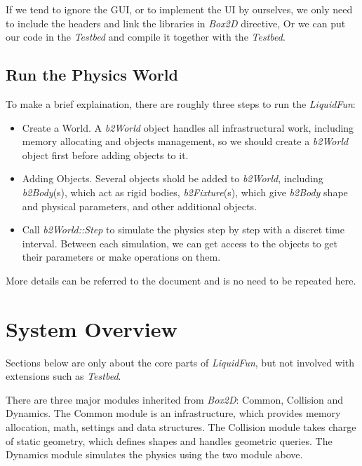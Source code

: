 \documentclass[UTF8]{ctexart}
\begin{document}
            If we tend to ignore the GUI, or to implement the UI by ourselves, we only need to include the headers and link the libraries in \textit{Box2D} directive, Or we can put our code in the \textit{Testbed} and compile it together with the \textit{Testbed}.

        \subsection{Run the Physics World}

            To make a brief explaination, there are roughly three steps to run the \textit{LiquidFun}:

            \begin{itemize}
                \item Create a World. A \textit{b2World} object handles all infrastructural work, including memory allocating and objects management, so we should create a \textit{b2World} object first before adding objects to it.
                \item Adding Objects. Several objects shold be added to \textit{b2World}, including \textit{b2Body}(s), which act as rigid bodies, \textit{b2Fixture}(s), which give \textit{b2Body} shape and physical parameters, and other additional objects.
                \item Call \textit{b2World::Step} to simulate the physics step by step with a discret time interval. Between each simulation, we can get access to the objects to get their parameters or make operations on them.
            \end{itemize}

            More details can be referred to the document and is no need to be repeated here.

    \section{System Overview}

        Sections below are only about the core parts of \textit{LiquidFun}, but not involved with extensions such as \textit{Testbed}.

        There are three major modules inherited from \textit{Box2D}: Common, Collision and Dynamics. The Common module is an infrastructure, which provides memory allocation, math, settings and data structures. The Collision module takes charge of static geometry, which defines shapes and handles geometric queries. The Dynamics module simulates the physics using the two module above.
\end{document}
